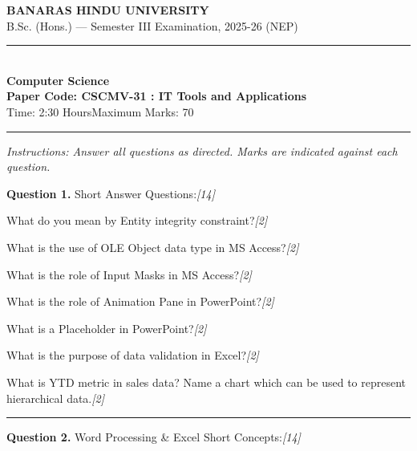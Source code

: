 \documentclass[11pt,a4paper]{article}
\newcommand{\pts}[1]{\hfill   \textit{[#1]}}
\begin{document}
\begin{center}
  {\large\bfseries BANARAS HINDU UNIVERSITY}\\[2pt]
  {\normalsize B.Sc. (Hons.) --- Semester III Examination, 2025-26 (NEP)}\\[6pt]
  \rule{0.8\linewidth}{0.5pt}\\[6pt]
  {\large\bfseries Computer Science}\\[4pt]
  {\large\bfseries Paper Code: CSCMV-31 : IT Tools and Applications}\\[4pt]
  {\normalsize Time: 2:30 Hours\hfill Maximum Marks: 70}
\end{center}

\rule{\linewidth}{0.4pt}

\smallskip



\noindent   \textit{Instructions: Answer all questions as directed. Marks are indicated against each question.}

\bigskip




\noindent   \textbf{Question 1.} Short Answer Questions:\pts{14}

\begin{parts}
  \item What do you mean by Entity integrity constraint?\pts{2}
  \item What is the use of OLE Object data type in MS Access?\pts{2}
  \item What is the role of Input Masks in MS Access?\pts{2}
  \item What is the role of Animation Pane in PowerPoint?\pts{2}
  \item What is a Placeholder in PowerPoint?\pts{2}
  \item What is the purpose of data validation in Excel?\pts{2}
  \item What is YTD metric in sales data? Name a chart which can be used to represent hierarchical data.\pts{2}
\end{parts}

\medskip\rule{\linewidth}{0.2pt}




\noindent   \textbf{Question 2.} Word Processing \& Excel Short Concepts:\pts{14}
\end{document}
